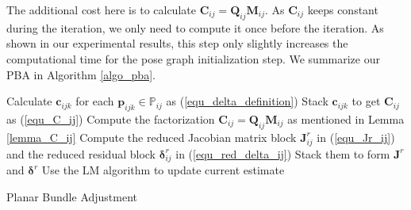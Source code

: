\documentclass{vgtc}                          %
\begin{document}
The additional  cost here is to calculate $\mathbf{C}_{ij}=\mathbf{Q}_{ij}\mathbf{M}_{ij}$. As $\mathbf{C}_{ij}$ keeps constant during the iteration, we only need to compute it once before the iteration. As shown in our experimental results, this step only slightly increases the computational time for  the pose graph initialization step. %
We summarize our PBA in Algorithm \autoref{algo_pba}.
\begin{algorithm} \label{algo_pba}
	\SetAlgoLined
	Calculate $\mathbf{c}_{ijk}$ for each $\mathbf{p}_{ijk} \in \mathbb{P}_{ij}$ as (\ref{equ_delta_definition})\;
	Stack $\mathbf{c}_{ijk}$ to get $\mathbf{C}_{ij}$ as (\ref{equ_C_ij})\;
	Compute the factorization $\mathbf{C}_{ij}=\mathbf{Q}_{ij}\mathbf{M}_{ij}$ as mentioned in Lemma \autoref{lemma_C_ij}\;
		{ Compute the reduced Jacobian matrix block $\mathbf{J}_{ij}^{r}$ in (\ref{equ_Jr_ij}) and the reduced residual block $\bm{\delta}_{ij}^{r}$ in (\ref{equ_red_delta_ij})\;
		   Stack them to form $\mathbf{J}^{r}$ and $\bm{\delta}^{r}$\;
		   Use the LM algorithm to update  current estimate\;
		}  
			\caption{Planar Bundle Adjustment}
\end{algorithm}
\end{document}

